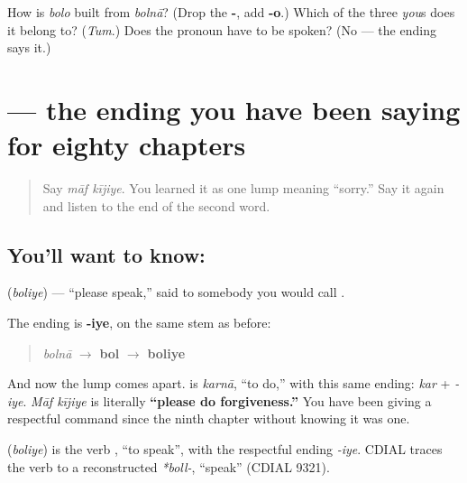 \begin{tcolorbox}[breakable,colback=teal!4,colframe=teal!35!black,title={Before you move on}]
How is \emph{bolo} built from \emph{bolnā}? (Drop the \textbf{-}, add \textbf{-o}.) Which of the three \emph{you}s does it belong to? (\emph{Tum}.) Does the pronoun have to be spoken? (No — the ending says it.)
\end{tcolorbox}
\section[\texorpdfstring{\hi{बोलिए} (boliye)}{बोलिए (boliye)}]{ — the ending you have been saying for eighty chapters}

\label{lesson:HI-C85-boliye}



\begin{quote}
Say \emph{māf kījiye}. You learned it as one lump meaning \textquotedblleft{}sorry.\textquotedblright{} Say it again and listen to the end of the second word.
\end{quote}

\subsection*{You'll want to know: }
\textbf{} (\emph{boliye}) — \textquotedblleft{}please speak,\textquotedblright{} said to somebody you would call \textbf{}.

The ending is \textbf{-iye}, on the same stem as before:

\begin{quote}
\emph{bolnā} $\to$ \textbf{bol} $\to$ \textbf{boliye}
\end{quote}

And now the lump comes apart. \textbf{} is \emph{karnā}, \textquotedblleft{}to do,\textquotedblright{} with this same ending: \emph{kar} + \emph{-iye}. \emph{Māf kījiye} is literally \textbf{\textquotedblleft{}please do forgiveness.\textquotedblright{}} You have been giving a respectful command since the ninth chapter without knowing it was one.

\begin{cousinweb}
\textbf{} (\emph{boliye}) is the verb \textbf{}, \textquotedblleft{}to speak\textquotedblright{}, with the respectful ending \emph{-iye}. CDIAL traces the verb to a reconstructed \emph{*boll-}, \textquotedblleft{}speak\textquotedblright{} (CDIAL 9321).
\end{cousinweb}

